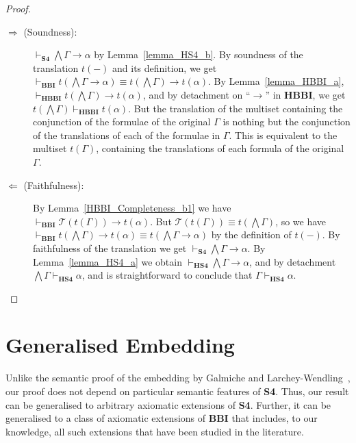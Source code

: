 \documentclass[a4paper]{article}
\newcommand{\BBI}{\textbf{BBI}\xspace}
\newcommand{\SFour}{\textbf{S4}\xspace}
\begin{document}
\begin{proof}
\begin{description}

    \item[$\Rightarrow$ (Soundness):] $ \vdash_{\SFour} \bigwedge \Gamma \rightarrow \alpha$ by Lemma~\ref{lemma_HS4_b}.
By soundness of the translation $t(-)$ and its definition, we get $\vdash_{\BBI}t(\bigwedge \Gamma \rightarrow \alpha)\equiv t(\bigwedge \Gamma)\rightarrow t(\alpha)$. By Lemma~\ref{lemma_HBBI_a}, $\vdash_{\textbf{HBBI}} t(\bigwedge \Gamma)\rightarrow t(\alpha)$, and by detachment on ``$\rightarrow$'' in \textbf{HBBI}, we get $t(\bigwedge \Gamma) \vdash_{\textbf{HBBI}}t(\alpha)$. But the translation of the multiset containing the conjunction of the formulae of the original $\Gamma$ is nothing but the conjunction of the translations of each of the formulae in $\Gamma$. This is equivalent to the multiset $t(\Gamma)$, containing the translations of each formula of the original $\Gamma$.

\item[$\Leftarrow$ (Faithfulness):] By Lemma~\ref{HBBI_Completeness_b1} we have $\vdash_{\BBI}\mathcal{T} (t(\Gamma))\rightarrow t(\alpha)$. But $\mathcal{T} (t(\Gamma)) \equiv t(\bigwedge \Gamma)$, so we have $\vdash_{\BBI}t(\bigwedge\Gamma)\rightarrow t(\alpha) \equiv t(\bigwedge \Gamma \rightarrow \alpha)$ by the definition of $t(-)$. By faithfulness of the translation we get $\vdash_{\SFour}\bigwedge \Gamma \rightarrow \alpha$. By Lemma~\ref{lemma_HS4_a} we obtain $\vdash_{\textbf{HS4}}\bigwedge \Gamma \rightarrow \alpha$, and by detachment $\bigwedge \Gamma\vdash_{\textbf{HS4}} \alpha$, and is straightforward to conclude that
$\Gamma\vdash_{\textbf{HS4}} \alpha$.    
\end{description}    
\end{proof}

\section{Generalised Embedding}
\label{Sec:general}

Unlike the semantic proof of the embedding by Galmiche and Larchey-Wendling~\cite{galmiche_expressivity_2006},
our proof does not depend on particular semantic features of \SFour. Thus, our result can be generalised to arbitrary
axiomatic extensions of \SFour. Further, it can be generalised to a class of axiomatic extensions of \BBI that includes,
to our knowledge, all such extensions that have been studied in the literature.
\end{document}
